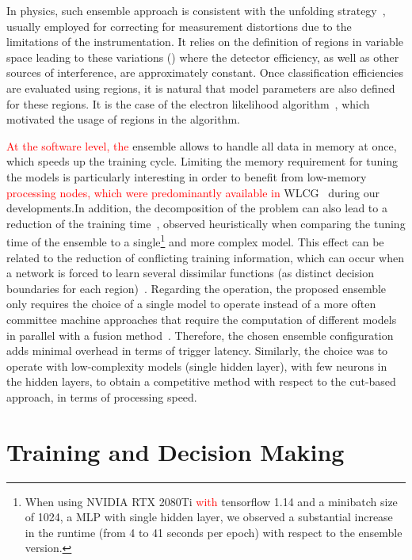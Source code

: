 In physics, such ensemble approach is consistent with the unfolding
strategy~\cite{Cowan1998}, usually employed for correcting for
measurement distortions due to the limitations of the instrumentation. It relies
on the definition of regions in variable space leading to these
variations (\eteta{}) where the detector efficiency, as well as other
sources of interference, are approximately constant. Once classification
efficiencies are evaluated using regions, it is natural that model parameters
are also defined for these regions. It is the case of the electron likelihood
algorithm~\cite{atlas_electron_id_offline}, which motivated the usage of
\eteta{} regions in the \rnn{} algorithm.

\textcolor{red}{At the software level, the} ensemble allows to handle all data in memory at once,
which speeds up the training cycle. Limiting the memory requirement for tuning
the models is particularly interesting in order to benefit from low-memory 
\textcolor{red}{ processing nodes, which were predominantly available in} 
WLCG~\cite{2015_lcg_tdr} during our
developments.\@ In addition, the decomposition of the problem can also lead to a
reduction of the training time~\cite{Polikar2006}, observed heuristically when
comparing the tuning time of the ensemble to a single\footnote{
  When using NVIDIA RTX 2080Ti \textcolor{red}{with} tensorflow 1.14 and a minibatch size of 1024, a 
  MLP with single hidden layer, we observed a substantial increase in the runtime (from 4 
  to 41 seconds per epoch) with respect to the ensemble version.
} and more complex model.
This effect can be related to the reduction of conflicting training information,
which can occur when a network is forced to learn several dissimilar functions
(as distinct decision boundaries for each region)~\cite{Auda1999,haykin_2008}.
Regarding the operation, the proposed ensemble only requires the choice of a
single model to operate instead of a more often committee machine approaches
that require the computation of different models in parallel with a fusion
method~\cite{zhou_ensemble}.  Therefore, the chosen ensemble configuration adds
minimal overhead in terms of trigger latency. Similarly, the choice was to
operate with low-complexity models (single hidden layer), with few neurons in
the hidden layers, to obtain a competitive method with respect to the cut-based
approach, in terms of processing speed.



\section{Training and Decision Making}%
\label{sec:tuning}

